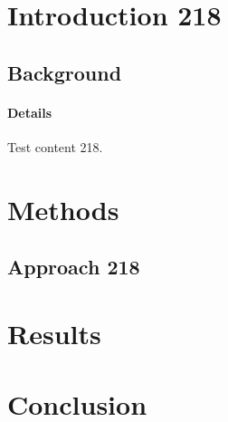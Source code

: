 \documentclass{article}
\begin{document}
\section{Introduction 218}
\subsection{Background}
\paragraph{Details} Test content 218.
\section{Methods}
\subsection{Approach 218}
\section{Results}
\section{Conclusion}
\end{document}
